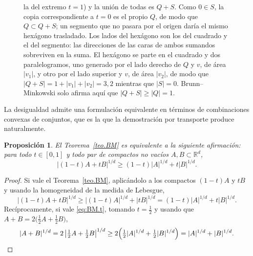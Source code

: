 \documentclass[12pt, a4paper]{amsbook}
\newcommand{\R}{{\mathbb R}}
\newtheorem{prop}[teo]{Proposición}
\theoremstyle{remark}
\theoremstyle{definition}
\numberwithin{section}{chapter}
\numberwithin{subsection}{section}
\numberwithin{equation}{section}
\numberwithin{figure}{chapter}
\begin{document}
\begin{figure}[ht]
{la del extremo $t=1$) y la unión de todas es $Q+S$. Como $0\in S$, la copia
correspondiente a $t=0$ es el propio $Q$, de modo que $Q\subset Q+S$; un
segmento que no pasara por el origen daría el mismo hexágono trasladado.
Los lados del hexágono son los del cuadrado y el del segmento: las direcciones
de las caras de ambos sumandos sobreviven en la suma. El hexágono se parte en
el cuadrado y dos paralelogramos, uno generado por el lado derecho de $Q$ y
$v$, de área $|v_1|$, y otro por el lado superior y $v$, de área $|v_2|$, de
modo que $|Q+S|=1+|v_1|+|v_2|=3{,}2$ mientras que $|S|=0$. Brunn--Minkowski
solo afirma aquí que $|Q+S|\ge|Q|=1$.}
\label{fig.BM.cubo.segmento}
\end{figure}

La desigualdad admite una formulación equivalente en términos de combinaciones
convexas de conjuntos, que es la que la demostración por transporte produce
naturalmente.

\begin{prop}\label{prop.BM.equivalencia}
El Teorema~\ref{teo.BM} es equivalente a la siguiente afirmación: para todo
$t\in[0,1]$ y todo par de compactos no vacíos $A,B\subset\R^d$,
\begin{equation}\label{eq:BM.t}
|(1-t)A+tB|^{1/d}\ge(1-t)|A|^{1/d}+t|B|^{1/d}.
\end{equation}
\end{prop}

\begin{proof}
Si vale el Teorema~\ref{teo.BM}, aplicándolo a los compactos $(1-t)A$ y $tB$
y usando la homogeneidad de la medida de Lebesgue,
\[
|(1-t)A+tB|^{1/d}\ge|(1-t)A|^{1/d}+|tB|^{1/d}=(1-t)|A|^{1/d}+t|B|^{1/d}.
\]
Recíprocamente, si vale \eqref{eq:BM.t}, tomando $t=\tfrac12$ y usando que
$A+B=2\bigl(\tfrac12A+\tfrac12B\bigr)$,
\[
|A+B|^{1/d}=2\,\bigl|\tfrac12A+\tfrac12B\bigr|^{1/d}
\ge2\Bigl(\tfrac12|A|^{1/d}+\tfrac12|B|^{1/d}\Bigr)=|A|^{1/d}+|B|^{1/d}.
\]
\end{proof}
\end{document}
